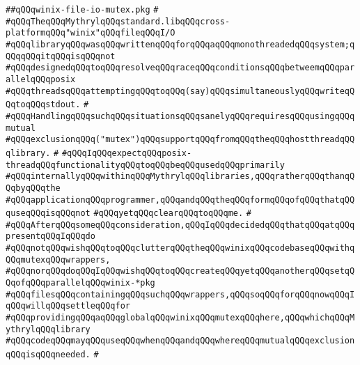 \label{src/lib/std/src/io/winix-file-io-mutex.pkg}
\verb|##qQQqwinix-file-io-mutex.pkg|\newline
\verb|#|\newline
\verb|#qQQqTheqQQqMythrylqQQqstandard.libqQQqcross-platformqQQq"winix"qQQqfileqQQqI/O|\newline
\verb|#qQQqlibraryqQQqwasqQQqwrittenqQQqforqQQqaqQQqmonothreadedqQQqsystem;qQQqqQQqitqQQqisqQQqnot|\newline
\verb|#qQQqdesignedqQQqtoqQQqresolveqQQqraceqQQqconditionsqQQqbetweemqQQqparallelqQQqposix|\newline
\verb|#qQQqthreadsqQQqattemptingqQQqtoqQQq(say)qQQqsimultaneouslyqQQqwriteqQQqtoqQQqstdout.|\newline
\verb|#|\newline
\verb|#qQQqHandlingqQQqsuchqQQqsituationsqQQqsanelyqQQqrequiresqQQqusingqQQqmutual|\newline
\verb|#qQQqexclusionqQQq("mutex")qQQqsupportqQQqfromqQQqtheqQQqhostthreadqQQqlibrary.|\newline
\verb|#|\newline
\verb|#qQQqIqQQqexpectqQQqposix-threadqQQqfunctionalityqQQqtoqQQqbeqQQqusedqQQqprimarily|\newline
\verb|#qQQqinternallyqQQqwithinqQQqMythrylqQQqlibraries,qQQqratherqQQqthanqQQqbyqQQqthe|\newline
\verb|#qQQqapplicationqQQqprogrammer,qQQqandqQQqtheqQQqformqQQqofqQQqthatqQQquseqQQqisqQQqnot|\newline
\verb|#qQQqyetqQQqclearqQQqtoqQQqme.|\newline
\verb|#|\newline
\verb|#qQQqAfterqQQqsomeqQQqconsideration,qQQqIqQQqdecidedqQQqthatqQQqatqQQqpresentqQQqIqQQqdo|\newline
\verb|#qQQqnotqQQqwishqQQqtoqQQqclutterqQQqtheqQQqwinixqQQqcodebaseqQQqwithqQQqmutexqQQqwrappers,|\newline
\verb|#qQQqnorqQQqdoqQQqIqQQqwishqQQqtoqQQqcreateqQQqyetqQQqanotherqQQqsetqQQqofqQQqparallelqQQqwinix-*pkg|\newline
\verb|#qQQqfilesqQQqcontainingqQQqsuchqQQqwrappers,qQQqsoqQQqforqQQqnowqQQqIqQQqwillqQQqsettleqQQqfor|\newline
\verb|#qQQqprovidingqQQqaqQQqglobalqQQqwinixqQQqmutexqQQqhere,qQQqwhichqQQqMythrylqQQqlibrary|\newline
\verb|#qQQqcodeqQQqmayqQQquseqQQqwhenqQQqandqQQqwhereqQQqmutualqQQqexclusionqQQqisqQQqneeded.|\newline
\verb|#|\newline
